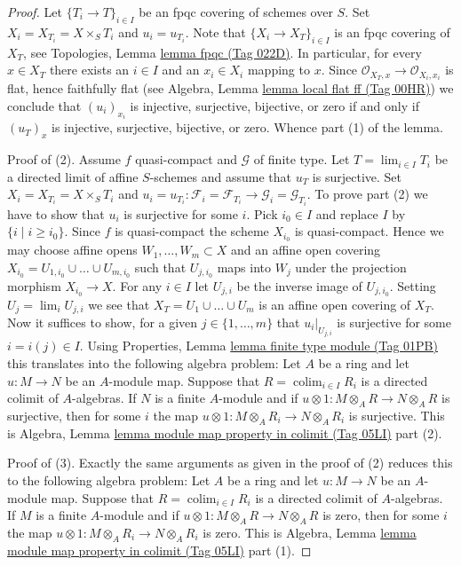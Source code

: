 \documentclass{amsart}
\theoremstyle{plain}
\theoremstyle{definition}
\theoremstyle{remark}
\numberwithin{equation}{subsection}
\def\lim{\mathop{\mathrm{lim}}\nolimits}
\def\colim{\mathop{\mathrm{colim}}\nolimits}
\begin{document}
\begin{proof}
Let $\{T_i \to T\}_{i \in I}$ be an fpqc covering of schemes over $S$.
Set $X_i = X_{T_i} = X \times_S T_i$ and $u_i = u_{T_i}$.
Note that $\{X_i \to X_T\}_{i \in I}$ is an fpqc covering of $X_T$, see
Topologies, Lemma \href{https://stacks.math.columbia.edu/tag/022D}{lemma fpqc (Tag 022D)}.
In particular, for every $x \in X_T$ there exists an $i \in I$
and an $x_i \in X_i$ mapping to $x$. Since
$\mathcal{O}_{X_T, x} \to \mathcal{O}_{X_i, x_i}$ is flat, hence
faithfully flat (see
Algebra, Lemma \href{https://stacks.math.columbia.edu/tag/00HR}{lemma local flat ff (Tag 00HR)})
we conclude that $(u_i)_{x_i}$ is injective, surjective, bijective, or zero
if and only if $(u_T)_x$ is injective, surjective, bijective, or zero.
Whence part (1) of the lemma.

\medskip\noindent
Proof of (2). Assume $f$ quasi-compact and $\mathcal{G}$ of finite type.
Let $T = \lim_{i \in I} T_i$ be a directed limit of affine $S$-schemes
and assume that $u_T$ is surjective.
Set $X_i = X_{T_i} = X \times_S T_i$ and
$u_i = u_{T_i} : \mathcal{F}_i = \mathcal{F}_{T_i}
\to \mathcal{G}_i = \mathcal{G}_{T_i}$.
To prove part (2) we have to show that $u_i$ is surjective for some $i$.
Pick $i_0 \in I$ and replace $I$ by $\{i \mid i \geq i_0\}$.
Since $f$ is quasi-compact the scheme $X_{i_0}$ is quasi-compact.
Hence we may choose affine opens $W_1, \ldots, W_m \subset X$
and an affine open covering
$X_{i_0} = U_{1, i_0} \cup \ldots \cup U_{m, i_0}$ such that
$U_{j, i_0}$ maps into $W_j$ under the projection morphism $X_{i_0} \to X$.
For any $i \in I$ let $U_{j, i}$ be the inverse image of $U_{j, i_0}$.
Setting $U_j = \lim_i U_{j, i}$ we see that $X_T = U_1 \cup \ldots \cup U_m$
is an affine open covering of $X_T$. Now it suffices to show, for a given
$j \in \{1, \ldots, m\}$ that $u_i|_{U_{j, i}}$ is surjective for some
$i = i(j) \in I$. Using
Properties, Lemma \href{https://stacks.math.columbia.edu/tag/01PB}{lemma finite type module (Tag 01PB)}
this translates into the following algebra problem:
Let $A$ be a ring and let $u : M \to N$ be an $A$-module map.
Suppose that $R = \colim_{i \in I} R_i$ is a directed colimit
of $A$-algebras. If $N$ is a finite $A$-module and if
$u \otimes 1 : M \otimes_A R \to N \otimes_A R$ is surjective, then
for some $i$ the map
$u \otimes 1 : M \otimes_A R_i \to N \otimes_A R_i$ is surjective.
This is
Algebra, Lemma \href{https://stacks.math.columbia.edu/tag/05LI}{lemma module map property in colimit (Tag 05LI)} part (2).

\medskip\noindent
Proof of (3). Exactly the same arguments as given in the proof of (2)
reduces this to the following algebra problem:
Let $A$ be a ring and let $u : M \to N$ be an $A$-module map.
Suppose that $R = \colim_{i \in I} R_i$ is a directed colimit
of $A$-algebras. If $M$ is a finite $A$-module and if
$u \otimes 1 : M \otimes_A R \to N \otimes_A R$ is zero, then
for some $i$ the map
$u \otimes 1 : M \otimes_A R_i \to N \otimes_A R_i$ is zero.
This is
Algebra, Lemma \href{https://stacks.math.columbia.edu/tag/05LI}{lemma module map property in colimit (Tag 05LI)} part (1).


\end{proof}
\end{document}
